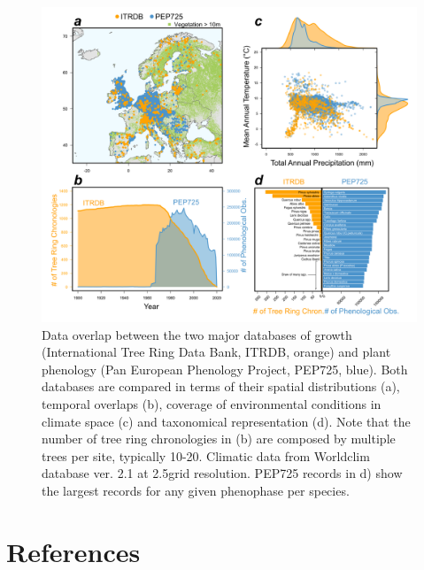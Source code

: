 \documentclass[11pt]{article}
\begin{document}
\clearpage
\begin{figure}[h!]
\includegraphics[width=1\textwidth]{..//figures/_figuresFromRuben/itrdb_vs_pep.png} %
\caption{Data overlap between the two major databases of growth (International Tree Ring Data Bank, ITRDB, orange) and plant phenology (Pan European Phenology Project, PEP725, blue). Both databases are compared in terms of their spatial distributions (a), temporal overlaps (b), coverage of environmental conditions in climate space (c) and taxonomical representation (d). Note that the number of tree ring chronologies in (b) are composed by multiple trees per site, typically 10-20. Climatic data from Worldclim database ver. 2.1 at 2.5\degree grid resolution. PEP725 records in d) show the largest records for any given phenophase per species.}
\label{fig:itrbdpep}
\end{figure}


\clearpage
\section*{References}


\end{document}
